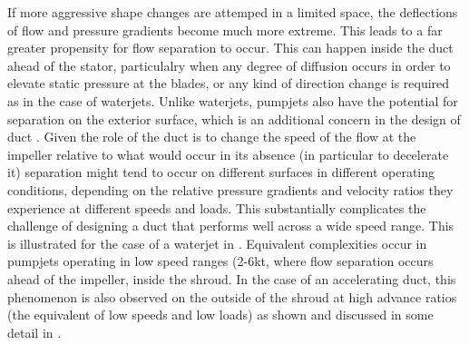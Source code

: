\documentclass{article}\usepackage[]{graphicx}\usepackage[]{color}
\begin{document}
If more aggressive shape changes are attemped in a limited space, the deflections of flow and pressure gradients become much more extreme. This leads to a far greater propensity for flow separation to occur.  This can happen inside the duct ahead of the stator, particulalry when any degree of diffusion occurs in order to elevate static pressure at the blades, or any kind of direction change is required as in the case of waterjets. Unlike waterjets, pumpjets also have the potential for separation on the exterior surface, which is an additional concern in the design of duct \cite[13]{henderson1964}.  Given the role of the duct is to change the speed of the flow at the impeller relative to what would occur in its absence (in particular to decelerate it) separation might tend to occur on different surfaces in different operating conditions, depending on the relative pressure gradients and velocity ratios they experience at different speeds and loads.  This substantially complicates the challenge of designing a duct that performs well across a wide speed range. This is illustrated for the case of a waterjet in \cite[20]{bulten2006numerical}.  Equivalent complexities occur in pumpjets operating in low speed ranges (2-6kt, where flow separation occurs ahead of the impeller, inside the shroud.  In the case of an accelerating duct, this phenomenon is also observed on the outside of the shroud at high advance ratios (the equivalent of low speeds and low loads) as shown and discussed in some detail in \cite{willemsen2013}.
\end{document}
